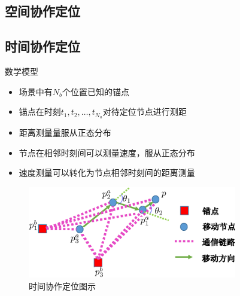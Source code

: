 \subsection[空间协作定位]{空间协作定位}
\subsection[时间协作定位]{时间协作定位}
\begin{frame}{数学模型}
\begin{itemize}
\item        场景中有$N_b$个位置已知的\alert{锚点}

\item        锚点在时刻$t_1,t_2,\dots,t_{N_a}$对待定位节点进行测距

\item        距离测量量服从正态分布

\item        节点在相邻时刻间可以测量速度，服从正态分布

\item        速度测量可以转化为节点相邻时刻间的距离测量
\end{itemize}
     \begin{figure}
          \centering
          \includegraphics[height=4cm]{cooperative_single_temporal.eps}
          \caption*{时间协作定位图示}
     \end{figure}

\end{frame}
